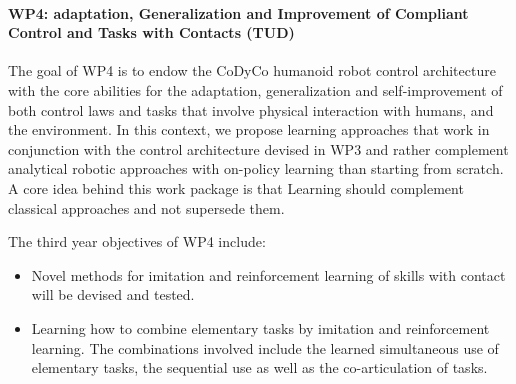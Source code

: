 \paragraph{WP4: adaptation, Generalization and Improvement of Compliant Control and Tasks with Contacts (TUD)}

The goal of WP4 is to endow the CoDyCo humanoid robot control architecture with the core abilities for the
adaptation, generalization and self-improvement of both control laws and tasks that involve physical interaction
with humans, and the environment. In this context, we propose learning approaches that work in conjunction
with the control architecture devised in WP3 and rather complement analytical robotic approaches with on-policy
learning than starting from scratch. A core idea behind this work package is that Learning should complement
classical approaches and not supersede them.

The third year objectives of WP4 include:
\begin{itemize}
\item Novel methods for imitation and reinforcement learning of skills with contact will be devised and tested. 
\item Learning how to combine elementary tasks by imitation and reinforcement learning. The combinations involved
include the learned simultaneous use of elementary tasks, the sequential use as well as the co-articulation of
tasks.
\end{itemize}


